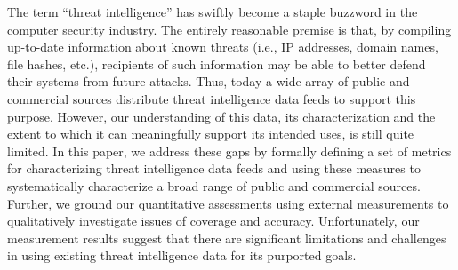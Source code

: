 The term ``threat intelligence'' has swiftly become a staple buzzword
in the computer security industry.  The entirely reasonable premise is
that, by compiling up-to-date information about known threats (i.e.,
IP addresses, domain names, file hashes, etc.), recipients of such
information may be able to better defend their systems from future
attacks.  Thus, today a wide array of public and commercial sources
distribute threat intelligence data feeds to support this purpose.
However, our understanding of this data, its characterization and the
extent to which it can meaningfully support its intended uses, is
still quite limited.  In this paper, we address these gaps by formally
defining a set of metrics for characterizing threat intelligence data
feeds and using these measures to systematically characterize a broad
range of public and commercial sources. Further, we ground our
quantitative assessments using external measurements to qualitatively
investigate issues of coverage and accuracy. Unfortunately, our
measurement results suggest that there are significant limitations and
challenges in using existing threat intelligence data for its
purported goals.
